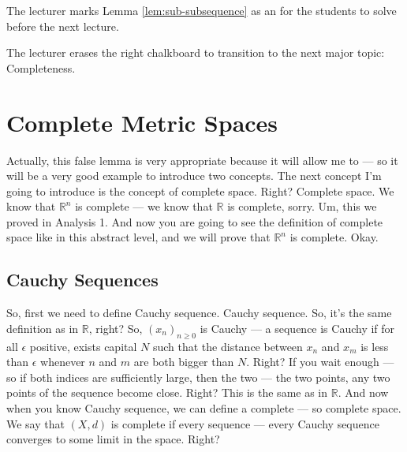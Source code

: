 \begin{nice-box}[Exercise]
The lecturer marks Lemma \ref{lem:sub-subsequence} as an  for the students to solve before the next lecture.
\end{nice-box}

\begin{meta-note}[Transition]
The lecturer erases the right chalkboard to transition to the next major topic: Completeness.
\end{meta-note}

\section{Complete Metric Spaces}

\begin{spoken-clean}[00:15:51 - 00:17:20]
Actually, this false lemma is very appropriate because it will allow me to — so it will be a very good example to introduce two concepts. The next concept I'm going to introduce is the concept of complete space. Right? Complete space. We know that $\mathbb{R}^n$ is complete — we know that $\mathbb{R}$ is complete, sorry. Um, this we proved in Analysis 1. And now you are going to see the definition of complete space like in this abstract level, and we will prove that $\mathbb{R}^n$ is complete. Okay.
\end{spoken-clean}

\subsection{Cauchy Sequences}

\begin{spoken-clean}[00:17:21 - 00:18:48]
So, first we need to define Cauchy sequence. Cauchy sequence.  So, it's the same definition as in $\mathbb{R}$, right? So, $(x_n)_{n \ge 0}$ is Cauchy — a sequence is Cauchy if for all $\epsilon$ positive, exists capital $N$ such that the distance between $x_n$ and $x_m$ is less than $\epsilon$ whenever $n$ and $m$ are both bigger than $N$. Right? If you wait enough --- so if both indices are sufficiently large, then the two --- the two points, any two points of the sequence become close. Right? This is the same as in $\mathbb{R}$. And now when you know Cauchy sequence, we can define a complete --- so complete space.  We say that $(X, d)$ is complete if every sequence --- every Cauchy sequence converges to some limit in the space. Right?
\end{spoken-clean}

